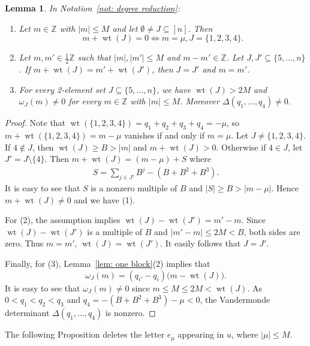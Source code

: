 \documentclass[12pt]{amsart}
\theoremstyle{plain}
\newtheorem{lemma}[theorem]{Lemma}
\theoremstyle{definition}
\numberwithin{equation}{theorem}
\newcommand{\ZZ}{\mathbb{Z}}
\newcommand{\length}[1]{\left\lvert #1\right\rvert}
\newcommand{\wt}{\operatorname{wt}}
\begin{document}
\begin{lemma}\label{lem: conseq of choice}
    In Notation~\ref{not: degree reduction}: 
    \begin{enumerate}
        \item Let $m \in \ZZ$ with $\length{m} \leq M$ and let $\emptyset \neq J \subseteq [n]$. Then 
        \[m + \wt(J) =0 \Leftrightarrow m = \mu, J = \{1, 2, 3, 4\}.\]
        \item Let $m, m' \in \frac{1}{2}\ZZ$ such that  $\length{m}, \length{m'} \leq M$ and $m-m' \in \ZZ$. Let $J, J' \subseteq \{5, \dots, n\}$. 
        If $m+\wt(J) = m'+\wt(J')$, then $J = J'$ and $m = m'$.
        \item For every 2-element set $J \subseteq \{5, \dots, n\}$, we have $\wt(J) > 2M$ and $\omega_J(m) \neq 0$ for every $m \in \ZZ$ with $\length{m} \leq M$. Moreover $\Delta(q_1, \dots, q_4) \neq 0$. 
    \end{enumerate}
\end{lemma}
\begin{proof}
    Note that $\wt(\{1, 2, 3, 4\}) = q_1 + q_2 + q_3 + q_4 = -\mu$, so $m + \wt(\{1, 2, 3, 4\}) = m - \mu$ vanishes if and only if $m = \mu$. Let $J \neq \{1, 2, 3, 4\}$. If $4 \notin J$, then $\wt(J) \geq B > \length{m}$ and $m + \wt(J) > 0$. Otherwise if $4 \in J$, let $J' = J \setminus \{4\}$. Then $m + \wt(J) = (m - \mu) + S$ where 
    \begin{align*}
        S = \sum_{j \in J'} B^j - (B + B^2 + B^3).
    \end{align*}
    It is easy to see that $S$ is a nonzero multiple of $B$ and $|S| \ge B > \length{m-\mu}$. Hence $m + \wt(J) \neq 0$ and we have (1).
    
    For (2), the assumption implies $\wt(J) - \wt(J') = m' - m$. Since $\wt(J) - \wt(J')$ is a multiple of $B$ and $\length{m'-m} \leq 2M < B$, both sides are zero. Thus $m = m'$, $\wt(J) = \wt(J')$. It easily follows that $J = J'$.
    
    Finally, for (3), Lemma~\ref{lem: one block}(2) implies that 
    \[
        \omega_J(m) = (q_{i'} - q_i)\bigl(m - \wt(J) \bigr).
    \]
    It is easy to see that $\omega_J(m) \neq 0$ since $m \leq M \leq 2M < \wt(J)$. As $0< q_1 < q_2 < q_3$ and $q_4 = -(B + B^2 + B^3) - \mu < 0$, the Vandermonde determinant $\Delta(q_1, \dots, q_4)$ is nonzero.
\end{proof}

The following Proposition deletes the letter $e_\mu$ appearing in $u$, where $\length{\mu} \leq M$. 
\end{document}
